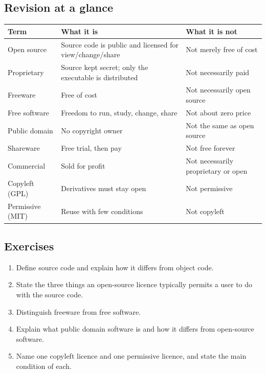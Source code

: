 \documentclass[11pt]{article}
\begin{document}
\subsection*{Revision at a glance}
\begin{center}
\begin{tabular}{p{}p{}p{}}
\toprule
\textbf{Term} & \textbf{What it is} & \textbf{What it is not} \\
\midrule
Open source & Source code is public and licensed for view/change/share & Not merely free of cost \\
Proprietary & Source kept secret; only the executable is distributed & Not necessarily paid \\
Freeware & Free of cost & Not necessarily open source \\
Free software & Freedom to run, study, change, share & Not about zero price \\
Public domain & No copyright owner & Not the same as open source \\
Shareware & Free trial, then pay & Not free forever \\
Commercial & Sold for profit & Not necessarily proprietary or open \\
Copyleft (GPL) & Derivatives must stay open & Not permissive \\
Permissive (MIT) & Reuse with few conditions & Not copyleft \\
\bottomrule
\end{tabular}
\end{center}

\subsection*{Exercises}
\begin{enumerate}[label=\arabic*.]
  \item Define source code and explain how it differs from object code.
  \item State the three things an open-source licence typically permits a user
    to do with the source code.
  \item Distinguish freeware from free software.
  \item Explain what public domain software is and how it differs from
    open-source software.
  \item Name one copyleft licence and one permissive licence, and state the
    main condition of each.
\end{enumerate}
\end{document}
